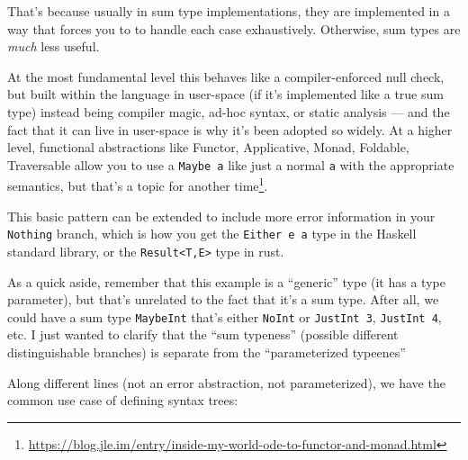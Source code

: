 \documentclass[]{article}
\renewcommand{\href}[2]{#2\footnote{\url{#1}}}
\begin{document}
That's because usually in sum type implementations, they are implemented in a
way that forces you to to handle each case exhaustively. Otherwise, sum types
are \emph{much} less useful.

At the most fundamental level this behaves like a compiler-enforced null check,
but built within the language in user-space (if it's implemented like a true sum
type) instead being compiler magic, ad-hoc syntax, or static analysis --- and
the fact that it can live in user-space is why it's been adopted so widely. At a
higher level, functional abstractions like Functor, Applicative, Monad,
Foldable, Traversable allow you to use a \texttt{Maybe\ a} like just a normal
\texttt{a} with the appropriate semantics, but that's
\href{https://blog.jle.im/entry/inside-my-world-ode-to-functor-and-monad.html}{a
topic for another time}.

This basic pattern can be extended to include more error information in your
\texttt{Nothing} branch, which is how you get the \texttt{Either\ e\ a} type in
the Haskell standard library, or the \texttt{Result\textless{}T,E\textgreater{}}
type in rust.

As a quick aside, remember that this example is a ``generic'' type (it has a
type parameter), but that's unrelated to the fact that it's a sum type. After
all, we could have a sum type \texttt{MaybeInt} that's either \texttt{NoInt} or
\texttt{JustInt\ 3}, \texttt{JustInt\ 4}, etc. I just wanted to clarify that the
``sum typeness'' (possible different distinguishable branches) is separate from
the ``parameterized typeenes''

Along different lines (not an error abstraction, not parameterized), we have the
common use case of defining syntax trees:
\end{document}
